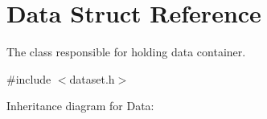 \hypertarget{structData}{}\section{Data Struct Reference}
\label{structData}


The class responsible for holding data container.  




{\ttfamily \#include $<$dataset.\+h$>$}



Inheritance diagram for Data\+:
